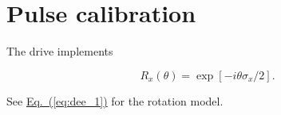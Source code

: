 \label{doc:dee}

\section{Pulse calibration}
\label{sec:dee_pulse-calibration}
The drive implements

\begin{equation}
    R_x(\theta)=\exp[-i\theta\sigma_x/2].
    \label{eq:dee_1}
\end{equation}

See \hyperref[eq:dee_1]{Eq.~(\ref*{eq:dee_1})} for the rotation model.

